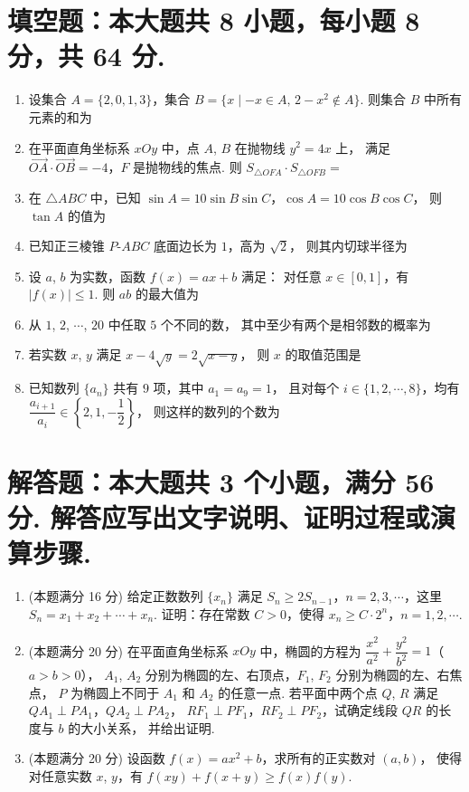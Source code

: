 \documentclass{chsmc}
\begin{document}
\section{填空题：本大题共 8 小题，每小题 8 分，共 64 分.}

\begin{enumerate}
	\item 设集合 $A = \{2,0,1,3\}$，集合
		$B = \{x\mid -x \in A,\, 2 - x^2 \notin A\}$.
		则集合 $B$ 中所有元素的和为 \blankline
	\item 在平面直角坐标系 $xOy$ 中，点 $A$, $B$ 在抛物线 $y^2 = 4x$ 上，
		满足 $\overrightarrow{OA}\cdot\overrightarrow{OB} = -4$，$F$ 是抛物线的焦点.
		则 $S_{\triangle OFA}\cdot S_{\triangle OFB} =$ \blankline
	\item 在 $\triangle ABC$ 中，已知
		$\sin A = 10\sin B\sin C$，$\cos A = 10\cos B\cos C$，
		则 $\tan A$ 的值为 \blankline
	\item 已知正三棱锥 $P$-$ABC$ 底面边长为 $1$，高为 $\sqrt{2}$，
		则其内切球半径为 \blankline
	\item 设 $a$, $b$ 为实数，函数 $f(x) = ax + b$ 满足：
		对任意 $x \in [0,1]$，有 $|f(x)| \leqslant 1$.
		则 $ab$ 的最大值为 \blankline
	\item 从 $1$, $2$, $\cdots$, $20$ 中任取 $5$ 个不同的数，
		其中至少有两个是相邻数的概率为 \blankline
	\item 若实数 $x$, $y$ 满足 $x - 4\sqrt{y} = 2\sqrt{x-y}$，
		则 $x$ 的取值范围是 \blankline
	\item 已知数列 $\{a_n\}$ 共有 $9$ 项，其中 $a_1 = a_9 = 1$，
		且对每个 $i \in \{1,2,\cdots,8\}$，均有
		$\dfrac{a_{i+1}}{a_i} \in \left\{2,1,-\dfrac{1}{2}\right\}$，
		则这样的数列的个数为 \blankline
\end{enumerate}

\section{解答题：本大题共 3 个小题，满分 56 分. 解答应写出文字说明、证明过程或演算步骤.}

\begin{enumerate}[resume]
	\item (本题满分 16 分) 给定正数数列 $\{x_n\}$ 满足
		$S_n \geqslant 2S_{n-1}$，$n = 2,3,\cdots$，这里
		$S_n = x_1 + x_2 + \cdots + x_n$.
		证明：存在常数 $C > 0$，使得 $x_n \geqslant C\cdot 2^n$，$n = 1,2,\cdots$.
	\item (本题满分 20 分) 在平面直角坐标系 $xOy$ 中，椭圆的方程为
		$\dfrac{x^2}{a^2} + \dfrac{y^2}{b^2} = 1$（$a > b > 0$），
		$A_1$, $A_2$ 分别为椭圆的左、右顶点，$F_1$, $F_2$ 分别为椭圆的左、右焦点，
		$P$ 为椭圆上不同于 $A_1$ 和 $A_2$ 的任意一点.
		若平面中两个点 $Q$, $R$ 满足 $QA_1 \perp PA_1$，$QA_2 \perp PA_2$，
		$RF_1 \perp PF_1$，$RF_2 \perp PF_2$，试确定线段 $QR$ 的长度与 $b$ 的大小关系，
		并给出证明.
	\item (本题满分 20 分) 设函数 $f(x) = ax^2 + b$，求所有的正实数对 $(a,b)$，
		使得对任意实数 $x$, $y$，有 $f(xy) + f(x+y) \geqslant f(x)f(y)$.
\end{enumerate}
\end{document}
